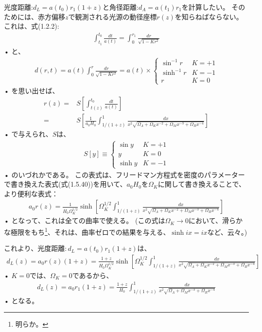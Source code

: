 \documentclass[11pt,a4paper,dvipdfmx]{jsarticle}
\theoremstyle{plain}
\theoremstyle{break}
\begin{document}
光度距離:$d_L = a(t_0) r_1 (1+z)$と角径距離:$d_A =a(t_1) r_1$を計算したい。
そのためには、赤方偏移$z$で観測される光源の動径座標$r(z)$を知らねばならない。
これは、式(1.2.2):
\begin{align}
  \int_{t_{1}}^{t_{0}} \frac{d t}{a(t)}=\int_{0}^{r_{1}} \frac{d r}{\sqrt{1-K r^{2}}}
\end{align}•%
と、
\begin{align}
   d(r, t)=a(t) \int_{0}^{r} \frac{d r}{\sqrt{1-K r^{2}}}=a(t) \times \left\{\begin{array}{ll}{\sin ^{-1} r} & {K=+1} \\ {\sinh ^{-1} r} & {K=-1} \\ {r} & {K=0}\end{array}\right.
\end{align}•%
を思い出せば、
\begin{align}
  r(z) 
    =& S\left[\int_{t(z)}^{t_{0}} \frac{d t}{a(t)}\right] \\
    =& S\left[\frac{1}{a_{0} H_{0}} \int_{1 /(1+z)}^{1} \frac{d x}{x^{2} \sqrt{\Omega_{\Lambda}+\Omega_{K} x^{-2}+\Omega_{M} x^{-3}+\Omega_{R} x^{-4}}}\right]
\end{align}•%
で与えられ、$S$は、
\begin{align}
  S[y] \equiv \left\{\begin{array}{ll}{\sin y} & {K=+1} \\ {y} & {K=0} \\ {\sinh y} & {K=-1}\end{array}\right.
\end{align}•%
のいづれかである。
この表式は、フリードマン方程式を密度のパラメーターで書き換えた表式(式(1.5.40))を用いて、$a_0 H_0$を$\Omega_{K}$に関して書き換えることで、より便利な表式：
\begin{align}
  a_{0} r(z)=\frac{1}{H_{0} \Omega_{K}^{1 / 2}} \sinh \left[\Omega_{K}^{1 / 2} \int_{1 /(1+z)}^{1} \frac{d x}{x^{2} \sqrt{\Omega_{\Lambda}+\Omega_{K} x^{-2}+\Omega_{M} x^{-3}+\Omega_{R} x^{-4}}}\right]
\end{align}•%
となって、これは全ての曲率で使える。
(この式は$\Omega_{K} \to 0$において、滑らかな極限をもち\footnote{明らか。}、それは、曲率ゼロでの結果を与える、$\sinh ix = ix $など、云々。)

これより、光度距離$:d_L = a(t_0) r_1 (1+z)$は、
\begin{align}
  d_{L}(z)=a_{0} r(z)(1+z)=\frac{1+z}{H_{0} \Omega_{K}^{1 / 2}} \sinh \left[\Omega_{K}^{1 / 2} \int_{1 /(1+z)}^{1} \frac{d x}{x^{2} \sqrt{\Omega_{\Lambda}+\Omega_{K} x^{-2}+\Omega_{M} x^{-3}+\Omega_{R} x^{-4}}}\right]
\end{align}•%
$K=0$では、$\Omega_{K} = 0$であるから、
\begin{align}
  d_{L}(z)=a_{0} r_{1}(1+z)=\frac{1+z}{H_{0}} \int_{1 /(1+z)}^{1} \frac{d x}{x^{2} \sqrt{\Omega_{\Lambda}+\Omega_{M} x^{-3}+\Omega_{R} x^{-4}}}
\end{align}•%
となる。
\end{document}
